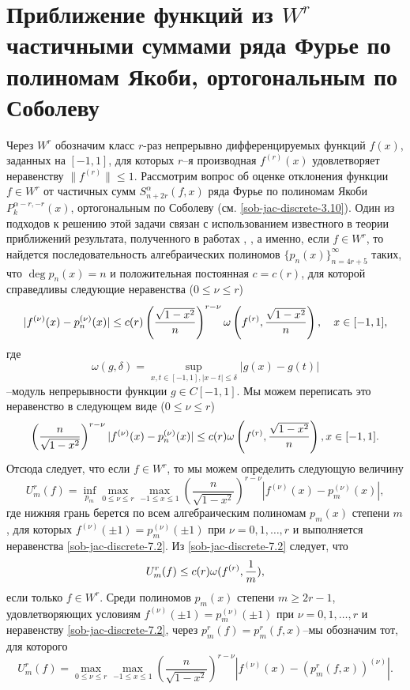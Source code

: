 \section{Приближение функций из $W^r$ частичными суммами ряда  Фурье по полиномам Якоби, ортогональным по Соболеву}
 Через $W^r$ обозначим класс $r$-раз непрерывно дифференцируемых функций $f(x)$, заданных на $[-1,1]$, для которых $r$--я производная $f^{(r)}(x)$ удовлетворяет неравенству $\|f^{(r)}\|\le1$.  Рассмотрим вопрос об оценке отклонения  функции  $f\in W^r$ от частичных сумм $S_{n+2r}^\alpha(f,x)$ ряда Фурье по полиномам Якоби $P_k^{\alpha-r,-r}(x)$, ортогональным по Соболеву (см. \eqref{sob-jac-discrete-3.10}).  Один из подходов к решению этой задачи    связан с использованием  известного в теории приближений
   результата, полученного в работах \cite{sob-jac-discrete-Tel}, \cite{sob-jac-discrete-Gop}, а именно, если $f\in
W^r$, то найдется последовательность алгебраических полиномов
$\{p_n(x)\}_{n=4r+5}^\infty$ таких, что $\deg p_n(x)=n$ и
положительная постоянная $c=c(r)$, для которой справедливы
следующие неравенства ($ 0\le\nu\le r$)
\begin{equation}\label{sob-jac-discrete-7.1}
|f^{(\nu)}(x)-p_n^{(\nu)}(x)|\le
c(r)\left(\frac{\sqrt{1-x^2}}{n}\right)^{r-\nu}\omega\left(f^{(r)},{{\sqrt{1-x^2}\over
n}}\right), \quad x\in [-1,1],
\end{equation}
где
 $$
 \omega(g,\delta)
=\sup_{x,t\in[-1,1],|x-t|\le\delta}|g(x)-g(t)|
$$
--модуль непрерывности функции $g\in C[-1,1]$. Мы можем переписать это неравенство
в следующем виде ($0\le\nu\le r$)
\begin{equation}\label{sob-jac-discrete-7.2}
\left(\frac{n}{\sqrt{1-x^2}}\right)^{r-\nu}|f^{(\nu)}(x)-p_n^{(\nu)}(x)|\le
c(r)\omega\left(f^{(r)},{{\sqrt{1-x^2}\over n}}\right),
x\in [-1,1].
\end{equation}
 Отсюда следует, что если $f\in W^r$,
то  мы можем определить следующую величину
\begin{equation}\label{sob-jac-discrete-7.3}
U_m^r(f)= \inf_{p_m}\max_{0\le\nu\le r}\max_{-1\le x\le1}\left(\frac{n}{\sqrt{1-x^2}}\right)^{r-\nu}|f^{(\nu)}(x)-p^{(\nu)}_m(x)|,
\end{equation}
 где нижняя грань берется по всем алгебраическим
полиномам $p_m(x)$ степени $m$, для которых
$f^{(\nu)}(\pm1)=p_m^{(\nu)}(\pm1)$ при $\nu=0,1,\ldots,r $ и выполняется неравенства \eqref{sob-jac-discrete-7.2}. Из
\eqref{sob-jac-discrete-7.2} следует, что
\begin{equation}\label{sob-jac-discrete-7.4}
U_m^r(f)\le c(r)\omega(f^{(r)},{1\over m}),
\end{equation}
если только $f\in W^r$. Среди полиномов
$p_m(x)$ степени $m\ge 2r-1$, удовлетворяющих условиям
$f^{(\nu)}(\pm1)=p_m^{(\nu)}(\pm1)$ при $\nu=0,1,\ldots,r$ и неравенству  \eqref{sob-jac-discrete-7.2},
через $p_m^r(f)=p_m^r(f,x)$--мы обозначим тот, для которого
\begin{equation}\label{sob-jac-discrete-7.5}
U_m^r(f)=  \max_{0\le\nu\le r}\max_{-1\le x\le1}\left(\frac{n}{\sqrt{1-x^2}}\right)^{r-\nu}|f^{(\nu)}(x)-(p_m^r(f,x))^{(\nu)}|.
\end{equation}


